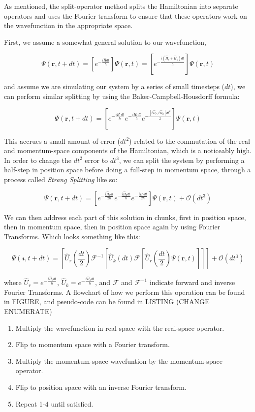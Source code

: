 As mentioned, the split-operator method splits the Hamiltonian into separate operators and uses the Fourier transform to ensure that these operators work on the wavefunction in the appropriate space.

First, we assume a somewhat general solution to our wavefunction,

$$
\Psi(\mathbf{r},t + dt) = \left[e^{-\frac{i\hat{H}dt}{\hbar}}\right]\Psi(\mathbf{r},t) = \left[e^{-\frac{i(\hat{H}_r + \hat{H}_k)dt}{\hbar}}\right]\Psi(\mathbf{r},t)
$$

and assume we are simulating our system by a series of small timesteps ($dt$), we can perform similar splitting by using the Baker-Campbell-Housdorff formula:

$$
\Psi(\mathbf{r},t+dt) = \left[e^{-\frac{i\hat{H}_rdt}{\hbar}}e^{-\frac{i\hat{H}_kdt}{\hbar}}e^{-\frac{[i\hat{H}_r, i\hat{H}_k]dt^2}{2}}\right]\Psi(\mathbf{r},t)
$$

This accrues a small amount of error ($dt^2$) related to the commutation of the real and momentum-space components of the Hamiltonian, which is a noticeably high.
In order to change the $dt^2$ error to $dt^3$, we can split the system by performing a half-step in position space before doing a full-step in momentum space, through a process called \textit{Strang Splitting} like so:

$$
\Psi(\mathbf{r},t+dt) = \left[e^{-\frac{i\hat{H}_rdt}{2\hbar}}e^{-\frac{i\hat{H}_kdt}{\hbar}}e^{-\frac{i\hat{H}_rdt}{2\hbar}} \right]\Psi(\mathbf{r},t) + \mathcal{O}(dt^3)
$$

We can then address each part of this solution in chunks, first in position space, then in momentum space, then in position space again by using Fourier Transforms.
Which looks something like this:

$$
\Psi(\mathcal{r}, t+dt) = \left[\hat{U}_r\left(\frac{dt}{2}\right)\mathcal{F}^{-1}\left[\hat{U}_k(dt) \mathcal{F} \left[\hat{U}_r\left(\frac{dt}{2}\right) \Psi(\mathbf{r},t) \right] \right] \right] + \mathcal{O}(dt^3)
$$

where $\hat{U}_r = e^{-\frac{i\hat{H}_rdt}{\hbar}}$, $\hat{U}_k = e^{-\frac{i\hat{H}_kdt}{\hbar}}$, and $\mathcal{F}$ and $\mathcal{F}^{-1}$ indicate forward and inverse Fourier Transforms.
A flowchart of how we perform this operation can be found in FIGURE, and pseudo-code can be found in LISTING (CHANGE ENUMERATE)

\begin{enumerate}
\item Multiply the wavefunction in real space with the real-space operator.
\item Flip to momentum space with a Fourier transform.
\item Multiply the momentum-space wavefuntion by the momentum-space operator.
\item Flip to position space with an inverse Fourier transform.
\item Repeat 1-4 until satisfied.
\end{enumerate}

